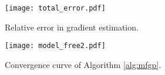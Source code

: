 \begin{figure}[t]
	\centering
	\begin{minipage}{0.48\columnwidth}
		\centering
		\texttt{[image: total\_error.pdf]}
		\caption{Relative error in gradient estimation.}
		\label{fig:totalerror}
	\end{minipage}
	\begin{minipage}{0.48\columnwidth}
		\centering
		\texttt{[image: model\_free2.pdf]}
		\caption{Convergence curve of Algorithm \ref{alg:mfgp}.}
		\label{fig:convergence-curve}
	\end{minipage}
\end{figure}


% 